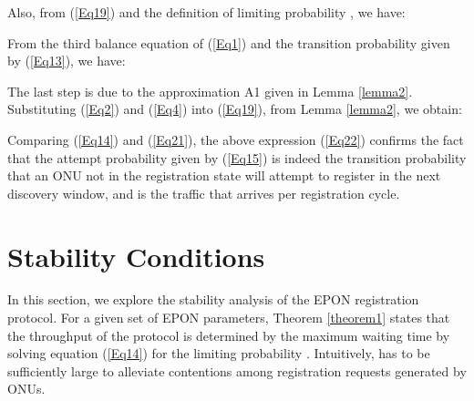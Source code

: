 \documentclass[journal]{IEEEtran}
\begin{document}
Also, from (\ref{Eq19}) and the definition of limiting probability , we have:

From the third balance equation of (\ref{Eq1}) and the transition probability given by (\ref{Eq13}), we have:

The last step is due to the approximation A1 given in Lemma \ref{lemma2}. Substituting (\ref{Eq2}) and (\ref{Eq4}) into (\ref{Eq19}), from Lemma \ref{lemma2}, we obtain:


Comparing (\ref{Eq14}) and (\ref{Eq21}), the above expression (\ref{Eq22}) confirms the fact that the attempt probability  given by (\ref{Eq15}) is indeed the transition probability  that an ONU not in the registration state will attempt to register in the next discovery window, and  is the traffic that arrives per registration cycle.




\section{Stability Conditions}\label{section3}
In this section, we explore the stability analysis of the EPON registration protocol. For a given set of EPON parameters, Theorem \ref{theorem1} states that the throughput of the protocol is determined by the maximum waiting time  by solving equation (\ref{Eq14}) for the limiting probability . Intuitively,  has to be sufficiently large to alleviate contentions among registration requests generated by ONUs.
\end{document}
